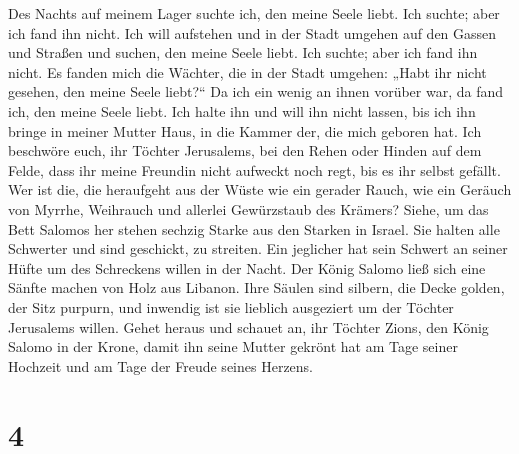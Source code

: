  Des Nachts auf meinem Lager suchte ich, den meine Seele
liebt. Ich suchte; aber ich fand ihn nicht.  Ich will
aufstehen und in der Stadt umgehen auf den Gassen und Straßen und
suchen, den meine Seele liebt. Ich suchte; aber ich fand ihn nicht.
 Es fanden mich die Wächter, die in der Stadt umgehen:
„Habt ihr nicht gesehen, den meine Seele liebt?{}``  Da
ich ein wenig an ihnen vorüber war, da fand ich, den meine Seele liebt.
Ich halte ihn und will ihn nicht lassen, bis ich ihn bringe in meiner
Mutter Haus, in die Kammer der, die mich geboren hat.  Ich
beschwöre euch, ihr Töchter Jerusalems, bei den Rehen oder Hinden auf
dem Felde, dass ihr meine Freundin nicht aufweckt noch regt, bis es ihr
selbst gefällt.  Wer ist die, die heraufgeht aus der Wüste
wie ein gerader Rauch, wie ein Geräuch von Myrrhe, Weihrauch und
allerlei Gewürzstaub des Krämers?  Siehe, um das Bett
Salomos her stehen sechzig Starke aus den Starken in Israel.
 Sie halten alle Schwerter und sind geschickt, zu
streiten. Ein jeglicher hat sein Schwert an seiner Hüfte um des
Schreckens willen in der Nacht.  Der König Salomo ließ
sich eine Sänfte machen von Holz aus Libanon.  Ihre
Säulen sind silbern, die Decke golden, der Sitz purpurn, und inwendig
ist sie lieblich ausgeziert um der Töchter Jerusalems willen.
 Gehet heraus und schauet an, ihr Töchter Zions, den
König Salomo in der Krone, damit ihn seine Mutter gekrönt hat am Tage
seiner Hochzeit und am Tage der Freude seines Herzens.

\hypertarget{section-3}{%
\section{4}\label{section-3}}

